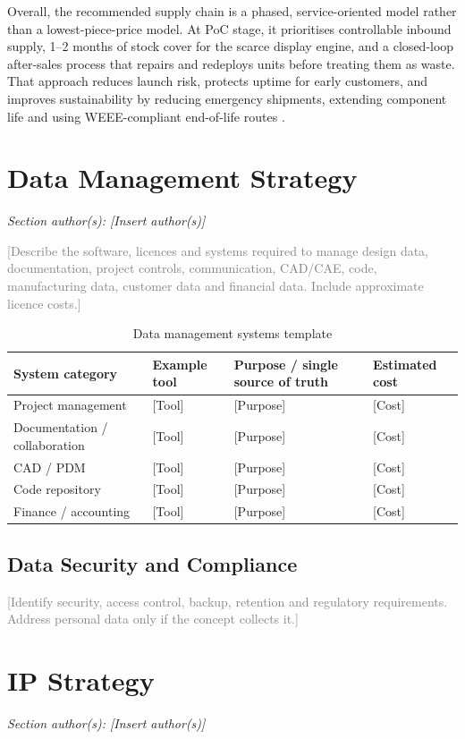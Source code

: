 \documentclass[11pt,a4paper]{article}
\newcommand{\placeholder}[1]{\textcolor{gray}{#1}}
\begin{document}
Overall, the recommended supply chain is a phased, service-oriented model rather than a lowest-piece-price model. At PoC stage, it prioritises controllable inbound supply, 1--2 months of stock cover for the scarce display engine, and a closed-loop after-sales process that repairs and redeploys units before treating them as waste. That approach reduces launch risk, protects uptime for early customers, and improves sustainability by reducing emergency shipments, extending component life and using WEEE-compliant end-of-life routes \cite{ref17,ref21,ref22}.

\section{Data Management Strategy}
\textit{Section author(s): [Insert author(s)]}

\placeholder{[Describe the software, licences and systems required to manage design data, documentation, project controls, communication, CAD/CAE, code, manufacturing data, customer data and financial data. Include approximate licence costs.]}

\begin{table}[H]
\centering
\caption{Data management systems template}
\footnotesize
\begin{tabularx}{\textwidth}{Y Y Y L{3cm}}
\toprule
\textbf{System category} & \textbf{Example tool} & \textbf{Purpose / single source of truth} & \textbf{Estimated cost} \\
\midrule
Project management & [Tool] & [Purpose] & [Cost] \\
Documentation / collaboration & [Tool] & [Purpose] & [Cost] \\
CAD / PDM & [Tool] & [Purpose] & [Cost] \\
Code repository & [Tool] & [Purpose] & [Cost] \\
Finance / accounting & [Tool] & [Purpose] & [Cost] \\
\bottomrule
\end{tabularx}
\end{table}

\subsection{Data Security and Compliance}
\placeholder{[Identify security, access control, backup, retention and regulatory requirements. Address personal data only if the concept collects it.]}

\section{IP Strategy}
\textit{Section author(s): [Insert author(s)]}
\end{document}
